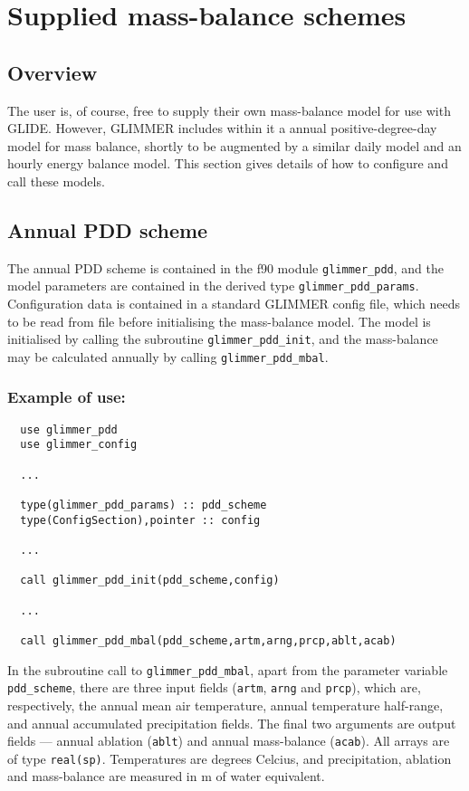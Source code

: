 \section{Supplied mass-balance schemes}
\subsection{Overview}
The user is, of course, free to supply their own mass-balance model for use
with GLIDE. However, GLIMMER includes within it a annual positive-degree-day model
for mass balance, shortly to be augmented by a similar daily model and an
hourly energy balance model. This section gives details of how to configure
and call these models.
\subsection{Annual PDD scheme}
\label{ug.mbal.pdd_scheme}
The annual PDD scheme is contained in the f90 module \texttt{glimmer\_pdd},
and the model parameters are contained in the derived type
\texttt{glimmer\_pdd\_params}. Configuration data is contained in a standard
GLIMMER config file, which needs to be read from file before initialising the
mass-balance model. The model is initialised by calling the subroutine
\texttt{glimmer\_pdd\_init}, and the mass-balance may be calculated annually
by calling \texttt{glimmer\_pdd\_mbal}. 

\subsubsection{Example of use:}
\begin{verbatim}
  use glimmer_pdd
  use glimmer_config

  ...

  type(glimmer_pdd_params) :: pdd_scheme
  type(ConfigSection),pointer :: config

  ...

  call glimmer_pdd_init(pdd_scheme,config)

  ...

  call glimmer_pdd_mbal(pdd_scheme,artm,arng,prcp,ablt,acab)
\end{verbatim}
In the subroutine call to \texttt{glimmer\_pdd\_mbal}, apart from the
parameter variable \texttt{pdd\_scheme}, there are three input fields
(\texttt{artm}, \texttt{arng} and \texttt{prcp}), which are, respectively, the
annual mean air temperature, annual temperature half-range, and annual
accumulated precipitation fields. The final two arguments are output fields
--- annual ablation (\texttt{ablt}) and annual mass-balance
(\texttt{acab}). All arrays are of type \texttt{real(sp)}. Temperatures are
degrees Celcius, and precipitation, ablation and mass-balance are measured in
m of water equivalent.
%
%
%
